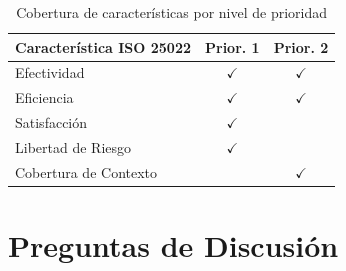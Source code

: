 \documentclass[12pt,a4paper]{article}
\begin{document}
\begin{table}[H]
\centering
\caption{Cobertura de caracter\'isticas por nivel de prioridad}
\begin{tabular}{l c c}
\toprule
\textbf{Caracter\'istica ISO 25022} & \textbf{Prior. 1} & \textbf{Prior. 2} \\
\midrule
Efectividad          & $\checkmark$ & $\checkmark$ \\
Eficiencia           & $\checkmark$ & $\checkmark$ \\
Satisfacci\'on        & $\checkmark$ & \\
Libertad de Riesgo   & $\checkmark$ & \\
Cobertura de Contexto & & $\checkmark$ \\
\bottomrule
\end{tabular}
\end{table}

\section{Preguntas de Discusi\'on}
\end{document}
